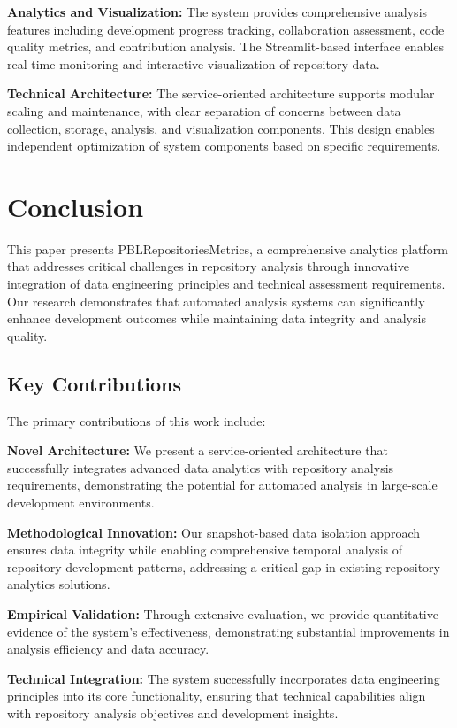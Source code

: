 \documentclass[12pt,a4paper]{article}
\begin{document}
\textbf{Analytics and Visualization:} The system provides comprehensive analysis features including development progress tracking, collaboration assessment, code quality metrics, and contribution analysis. The Streamlit-based interface enables real-time monitoring and interactive visualization of repository data.

\textbf{Technical Architecture:} The service-oriented architecture supports modular scaling and maintenance, with clear separation of concerns between data collection, storage, analysis, and visualization components. This design enables independent optimization of system components based on specific requirements.

\section{Conclusion}

This paper presents PBLRepositoriesMetrics, a comprehensive analytics platform that addresses critical challenges in repository analysis through innovative integration of data engineering principles and technical assessment requirements. Our research demonstrates that automated analysis systems can significantly enhance development outcomes while maintaining data integrity and analysis quality.

\subsection{Key Contributions}

The primary contributions of this work include:

\textbf{Novel Architecture:} We present a service-oriented architecture that successfully integrates advanced data analytics with repository analysis requirements, demonstrating the potential for automated analysis in large-scale development environments.

\textbf{Methodological Innovation:} Our snapshot-based data isolation approach ensures data integrity while enabling comprehensive temporal analysis of repository development patterns, addressing a critical gap in existing repository analytics solutions.

\textbf{Empirical Validation:} Through extensive evaluation, we provide quantitative evidence of the system's effectiveness, demonstrating substantial improvements in analysis efficiency and data accuracy.

\textbf{Technical Integration:} The system successfully incorporates data engineering principles into its core functionality, ensuring that technical capabilities align with repository analysis objectives and development insights.
\end{document}
